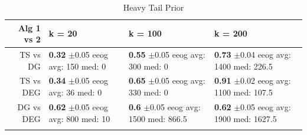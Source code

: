 \documentclass{article}
\theoremstyle{definition}
\begin{document}
\begin{table}[ht]
\centering
\caption{Heavy Tail Prior} 
\begin{tabular}{rlll}
  \hline
Alg 1 vs 2 & k = 20 & k = 100 & k = 200 \\ 
  \hline
TS vs DG & \makecell{\textbf{0.32} $\pm$0.05\\ eeog \\ avg: 150\\ med: 0} & \makecell{\textbf{0.55} $\pm$0.05\\ eeog \\ avg: 300\\ med: 0} & \makecell{\textbf{0.73} $\pm$0.04\\ eeog \\ avg: 1400\\ med: 226.5} \\ 
\hline
  TS vs DEG & \makecell{\textbf{0.34} $\pm$0.05\\ eeog \\ avg: 36\\ med: 0} & \makecell{\textbf{0.65} $\pm$0.05\\ eeog \\ avg: 330\\ med: 0} & \makecell{\textbf{0.91} $\pm$0.02\\ eeog \\ avg: 1100\\ med: 107.5} \\ 
  \hline
  DG vs DEG & \makecell{\textbf{0.62} $\pm$0.05\\ eeog \\ avg: 800\\ med: 10} & \makecell{\textbf{0.6} $\pm$0.05\\ eeog \\ avg: 1500\\ med: 866.5} & \makecell{\textbf{0.62} $\pm$0.05\\ eeog \\ avg: 1900\\ med: 1627.5} \\ 
   \hline
   \label{hm_ht}
\end{tabular}
\end{table}
\end{document}

